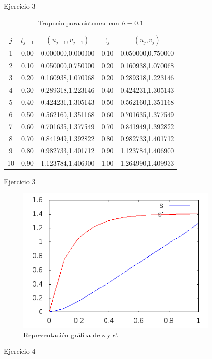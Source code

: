 		\begin{frame}{Ejercicio 3}
			\begin{table}[H]
				\centering
				\begin{tabular}{|| c | c | c | c | c ||}
					\hline
					\hline $j$ &  $t_{j-1}$ & $(u_{j-1},v_{j-1})$ & $t_j$ & $(u_{j},v_{j})$ \\
					\hline 1 & 0.00 & 0.000000,0.000000 & 0.10 & 0.050000,0.750000 \\
					\hline 2 & 0.10 & 0.050000,0.750000 & 0.20 & 0.160938,1.070068 \\
					\hline 3 & 0.20 & 0.160938,1.070068 & 0.20 & 0.289318,1.223146 \\
					\hline 4 & 0.30 & 0.289318,1.223146 & 0.40 & 0.424231,1.305143 \\
					\hline 5 & 0.40 & 0.424231,1.305143 & 0.50 & 0.562160,1.351168 \\
					\hline 6 & 0.50 & 0.562160,1.351168 & 0.60 & 0.701635,1.377549 \\
					\hline 7 & 0.60 & 0.701635,1.377549 & 0.70 & 0.841949,1.392822 \\
					\hline 8 & 0.70 & 0.841949,1.392822 & 0.80 & 0.982733,1.401712 \\
					\hline 9 & 0.80 & 0.982733,1.401712 & 0.90 & 1.123784,1.406900 \\
					\hline 10 & 0.90 & 1.123784,1.406900 & 1.00 & 1.264990,1.409933 \\
				\end{tabular}
				\caption{Trapecio para sistemas con $h=0.1$}
			\end{table}	
		\end{frame}
		
		\begin{frame}{Ejercicio 3}
			\begin{figure}[h]
				\centering
				\includegraphics[width=10cm]{./Images/ejemplo3-1.png}
				\caption{Representación gráfica de s y s'.}
			\end{figure}	
		\end{frame}										
													
		\begin{frame}{Ejercicio 4}
											
		\end{frame}										